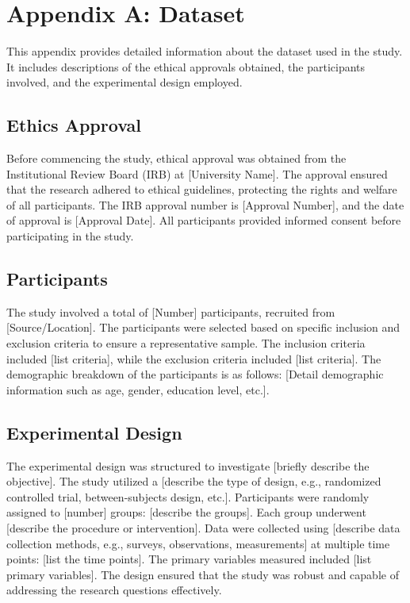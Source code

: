 




\section*{Appendix A: Dataset }


This appendix provides detailed information about the dataset used in the study. It includes descriptions of the ethical approvals obtained, the participants involved, and the experimental design employed.


\subsection*{Ethics Approval}
Before commencing the study, ethical approval was obtained from the Institutional Review Board (IRB) at [University Name]. The approval ensured that the research adhered to ethical guidelines, protecting the rights and welfare of all participants. The IRB approval number is [Approval Number], and the date of approval is [Approval Date]. All participants provided informed consent before participating in the study.

\subsection*{Participants}
The study involved a total of [Number] participants, recruited from [Source/Location]. The participants were selected based on specific inclusion and exclusion criteria to ensure a representative sample. The inclusion criteria included [list criteria], while the exclusion criteria included [list criteria]. The demographic breakdown of the participants is as follows: [Detail demographic information such as age, gender, education level, etc.].

\subsection*{Experimental Design}
The experimental design was structured to investigate [briefly describe the objective]. The study utilized a [describe the type of design, e.g., randomized controlled trial, between-subjects design, etc.]. Participants were randomly assigned to [number] groups: [describe the groups]. Each group underwent [describe the procedure or intervention]. Data were collected using [describe data collection methods, e.g., surveys, observations, measurements] at multiple time points: [list the time points]. The primary variables measured included [list primary variables]. The design ensured that the study was robust and capable of addressing the research questions effectively.

